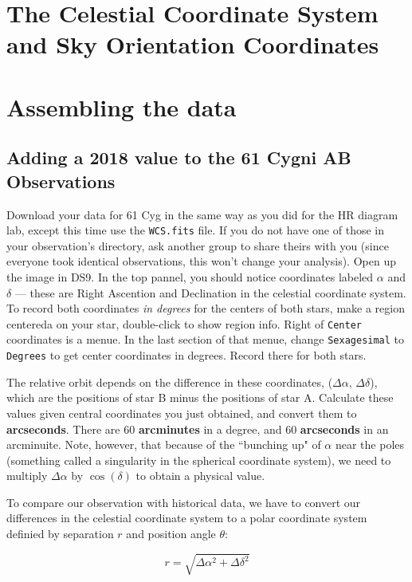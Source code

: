 \section{The Celestial Coordinate System and Sky Orientation Coordinates}
\section{Assembling the data}
\subsection{Adding a 2018 value to the 61 Cygni AB Observations}

Download your data for 61 Cyg in the same way as you did for the HR diagram lab, except this time use the \texttt{WCS.fits} file. If you do not have one of those in your observation's directory, ask another group to share theirs with you (since everyone took identical observations, this won't change your analysis). Open up the image in DS9. In the top pannel, you should notice coordinates labeled $\alpha$ and $\delta$ --- these are Right Ascention and Declination in the celestial coordinate system. To record both coordinates \textit{in degrees} for the centers of both stars, make a region centereda on your star, double-click to show region info. Right of \texttt{Center} coordinates is a menue. In the last section of that menue, change \texttt{Sexagesimal} to \texttt{Degrees} to get center coordinates in degrees. Record there for both stars.   

The relative orbit depends on the difference in these coordinates, ($\Delta\alpha$, $\Delta\delta$), which are the positions of star B minus the positions of star A. Calculate these values given central coordinates you just obtained, and convert them to \textbf{arcseconds}. There are 60 \textbf{arcminutes} in a degree, and 60 \textbf{arcseconds} in an arcminuite. Note, however, that because of the ``bunching up" of $\alpha$ near the poles (something called a singularity in the spherical coordinate system), we need to multiply $\Delta\alpha$ by $\cos(\delta)$ to obtain a physical value. 

To compare our observation with historical data, we have to convert our differences in the celestial coordinate system to a polar coordinate system definied by separation $r$ and position angle $\theta$:

\begin{equation}
r = \sqrt{\Delta\alpha^2 + \Delta\delta^2}
\end{equation}

